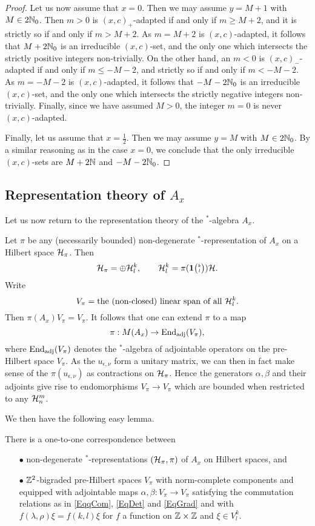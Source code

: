 \begin{proof}
Let us now assume that $x=0$. Then we may assume $y=M+1$ with $M\in 2\mathbb{N}_0$. Then $m>0$ is $(x,c)_+$-adapted if and only if $m\geq M+2$, and it is strictly so if and only if $m>M+2$. As $m=M+2$ is $(x,c)$-adapted, it follows that $M+2\mathbb{N}_0$ is an irreducible $(x,c)$-set, and the only one which intersects the strictly positive integers non-trivially. On the other hand, an $m<0$ is $(x,c)_-$-adapted if and only if $m\leq -M-2$, and strictly so if and only if $m<-M-2$. As $m=-M-2$ is $(x,c)$-adapted, it follows that $-M-2\mathbb{N}_0$ is an irreducible $(x,c)$-set, and the only one which intersects the strictly negative integers non-trivially. Finally, since we have assumed $M>0$, the integer $m=0$ is never $(x,c)$-adapted.

Finally, let us assume that $x=\frac{1}{2}$. Then we may assume $y=M$ with $M\in 2\mathbb{N}_0$. By a similar reasoning as in the case $x=0$, we conclude that the only irreducible $(x,c)$-sets are $M+2\mathbb{N}$ and $-M-2\mathbb{N}_0$.
\end{proof} 

\subsection{Representation theory of $A_x$}

Let us now return to the representation theory of the $^*$-algebra $A_x$.

Let $\pi$ be any (necessarily bounded) non-degenerate $^*$-representation of $A_x$ on a Hilbert space $\mathcal{H}_{\pi}$. Then \[\mathcal{H}_{\pi} = \oplus \mathcal{H}^{k}_{l},\qquad \mathcal{H}^{k}_{l} = \pi(\mathbf{1}{\tiny {\begin{pmatrix} k\\l\end{pmatrix}}})\mathcal{H}.\] Write \[V_{\pi} =  \textrm{the (non-closed) linear span of all }\mathcal{H}^{k}_{l}.\] Then $\pi(A_x)V_{\pi} = V_{\pi}$. It follows that one can extend $\pi$ to a map \[\pi: M(A_x) \rightarrow \operatorname{\mathrm{End}}_{\operatorname{\mathrm{adj}}}(V_{\pi}),\] where $\operatorname{\mathrm{End}}_{\operatorname{\mathrm{adj}}}(V_{\pi})$ denotes the $^*$-algebra of adjointable operators on the pre-Hilbert space $V_{\pi}$. As the $u_{\epsilon,\nu}$ form a unitary matrix, we can then in fact make sense of the $\pi(u_{\epsilon,\nu})$ as contractions on $\mathcal{H}_{\pi}$. Hence the generators $\alpha,\beta$ and their adjoints give rise to endomorphisms $V_{\pi}\rightarrow V_{\pi}$ which are bounded when restricted to any $\mathcal{H}^{m}_{n}$.

We then have the following easy lemma.

\begin{Lem} There is a one-to-one correspondence between\begin{itemize}\item[$\bullet$] non-degenerate $^*$-representations $(\mathcal{H}_{\pi},\pi)$ of $A_x$ on Hilbert spaces, and 
\item[$\bullet$] $\mathbb{Z}^2$-bigraded pre-Hilbert spaces $V_{\pi}$ with norm-complete components and equipped with adjointable maps $\alpha,\beta:V_{\pi}\rightarrow V_{\pi}$ satisfying the commutation relations as in \eqref{EqqCom}, \eqref{EqDet} and \eqref{EqGrad} and with $f(\lambda,\rho)\xi = f(k,l)\xi$ for $f$ a function on $\mathbb{Z}\times \mathbb{Z}$ and $\xi\in V^k_l$.
\end{itemize}
\end{Lem}

